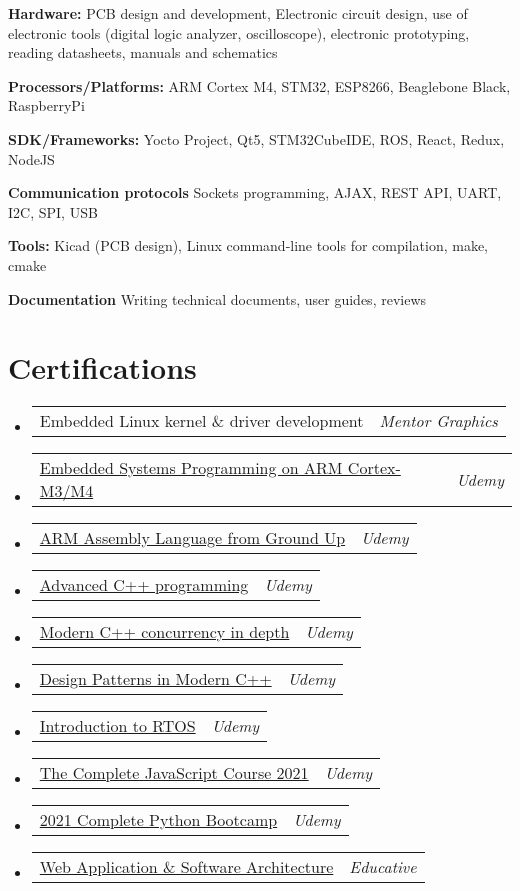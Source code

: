 \documentclass[a4paper,11pt]{article}
\makeatletter
\newcommand{\liststart}{\begin{itemize}[leftmargin=10pt]}
\newcommand{\listend}{\end{itemize}}
\newcommand{\listitemone}{\item}
\newcommand{\skill}[2] {
    \textbf{#1} #2 \\
    \vspace {3pt}
}
\newcommand{\cert}[2] {
    \listitemone
	\begin{tabular*}{7.1in}{l@{\extracolsep{\fill}}r}
	    {#1} & \textit{#2}
	\end{tabular*}\vspace{-6pt}
}
\makeatother
\begin{document}
\skill{Hardware:} {PCB design and development, Electronic circuit design,               use of electronic tools (digital logic analyzer, oscilloscope),
                   electronic prototyping, reading
                   datasheets, manuals and schematics}

\skill{Processors/Platforms:} {ARM Cortex M4, STM32, ESP8266, Beaglebone Black, RaspberryPi}

\skill{SDK/Frameworks:} {Yocto Project, Qt5, STM32CubeIDE, ROS, React, Redux, NodeJS}

\skill{Communication protocols} {Sockets programming, AJAX, REST API, UART, I2C, SPI, USB}

\skill{Tools:} {Kicad (PCB design), Linux command-line tools for 	  	 		            compilation, make, cmake}

\skill{Documentation} {Writing technical documents, user guides, reviews}


\vspace{0.005in}
\vspace{0.005in}
\section{Certifications}
\liststart
    \cert{Embedded Linux kernel \& driver development}{Mentor Graphics}
    \cert{\href{https://www.udemy.com/certificate/UC-014143dc-66f6-4203-addc-3c255e54ddbb/}{Embedded Systems Programming on ARM Cortex-M3/M4}}	  	          {Udemy}
    \cert{\href{https://www.udemy.com/certificate/UC-39a37dc0-8a26-4721-a7f4-61e2600e380e}{ARM Assembly Language from Ground Up}}	  	          {Udemy}
    \cert{\href{https://www.udemy.com/certificate/UC-VRNTEUJM/}{Advanced C++ programming}}{Udemy}
    \cert{\href{https://www.udemy.com/certificate/UC-0RLGR3RM/}{Modern C++ 		  concurrency in depth}}{Udemy}
    \cert{\href{https://www.udemy.com/certificate/UC-088f030e-b644-42e5-b2ee-a1cd61a53e96/}{Design Patterns in Modern C++}}{Udemy}
    \cert{\href{https://www.udemy.com/certificate/UC-A7SUDAR3/}				          {Introduction to RTOS}}{Udemy}
    \cert{\href{https://www.udemy.com/certificate/UC-b6b01a07-f2f0-4e2f-add1-37981acecf1f/}{The Complete JavaScript Course 2021}}{Udemy}
    \cert{\href{https://www.udemy.com/certificate/UC-11f326fc-276b-4cee-b3bf-1cb8c1529cc1/}{2021 Complete Python Bootcamp}}{Udemy}
    \cert{\href{https://www.educative.io/verify-certificate/2gKmzmJrwV3t0nlLzJ4pOKfL75574oplqc3}{Web Application \& Software Architecture}}{Educative}
\listend


\vspace{0.005in}
\end{document}

